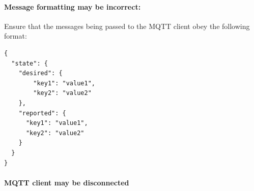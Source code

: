 \documentclass{article}
\begin{document}
			\paragraph{Message formatting may be incorrect:}
				Ensure that the messages being passed to the MQTT client obey the following format:
\begin{lstlisting}
{
  "state": {
    "desired": {
    	"key1": "value1",
    	"key2": "value2"
    },
    "reported": {
      "key1": "value1",
      "key2": "value2"
    }
  }
}
\end{lstlisting}
			\paragraph{MQTT client may be disconnected}
\end{document}
